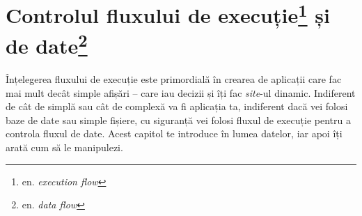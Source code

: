\chapter[Controlul fluxului de execuție și de date]{Controlul
fluxului de execuție\footnote{en.
\textsl{execution flow}} și de date\footnote{en.
\textsl{data flow}}}

\begin{chapsummary}
Înțelegerea fluxului de execuție este primordială
în crearea de aplicații care fac mai mult decât simple
afișări -- care iau decizii și îți fac \textsl{site}-ul dinamic.
Indiferent de cât de simplă sau cât de complexă va fi aplicația ta,
indiferent dacă vei folosi baze de date sau simple fișiere,
cu siguranță vei folosi fluxul de execuție pentru a controla
fluxul de date. Acest capitol te introduce în lumea datelor,
iar apoi îți arată cum să le manipulezi.
\end{chapsummary}




